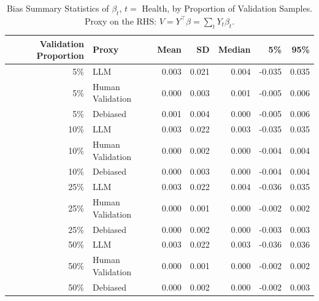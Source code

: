 \begin{table}

\caption{Bias Summary Statistics of $\beta_{t}$, $t=$ Health, by Proportion of Validation Samples.
      Proxy on the RHS: $V = Y^\top \beta = \sum_{t} Y_t \beta_t$.}
\centering
\begin{tabular}[t]{rlrrrrr}
\toprule
Validation Proportion & Proxy & Mean & SD & Median & 5\% & 95\%\\
\midrule
5\% & LLM & 0.003 & 0.021 & 0.004 & -0.035 & 0.035\\
5\% & Human Validation & 0.000 & 0.003 & 0.001 & -0.005 & 0.006\\
5\% & Debiased & 0.001 & 0.004 & 0.000 & -0.005 & 0.006\\
10\% & LLM & 0.003 & 0.022 & 0.003 & -0.035 & 0.035\\
10\% & Human Validation & 0.000 & 0.002 & 0.000 & -0.004 & 0.004\\
10\% & Debiased & 0.000 & 0.003 & 0.000 & -0.004 & 0.004\\
25\% & LLM & 0.003 & 0.022 & 0.004 & -0.036 & 0.035\\
25\% & Human Validation & 0.000 & 0.001 & 0.000 & -0.002 & 0.002\\
25\% & Debiased & 0.000 & 0.002 & 0.000 & -0.003 & 0.003\\
50\% & LLM & 0.003 & 0.022 & 0.003 & -0.036 & 0.036\\
50\% & Human Validation & 0.000 & 0.001 & 0.000 & -0.002 & 0.002\\
50\% & Debiased & 0.000 & 0.002 & 0.000 & -0.002 & 0.003\\
\bottomrule
\end{tabular}
\end{table}

